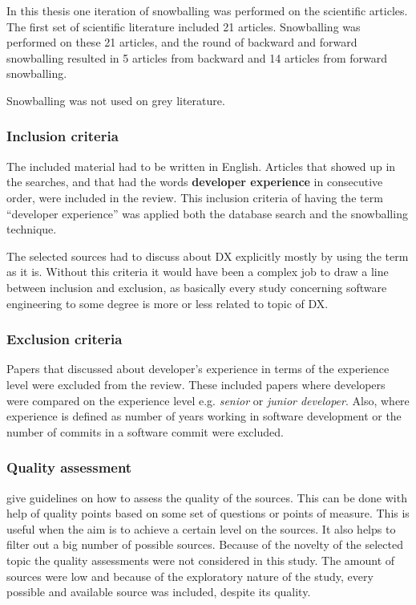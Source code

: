\documentclass[english, 12pt, a4paper, sci, utf8, a-1b, online]{aaltothesis}
\begin{document}
In this thesis one iteration of snowballing was performed on the scientific articles. The first set of scientific literature included 21 articles. Snowballing was performed on these 21 articles, and the round of backward and forward snowballing resulted in 5 articles from backward and 14 articles from forward snowballing.

Snowballing was not used on grey literature.

\subsubsection{Inclusion criteria}

The included material had to be written in English. Articles that showed up in the searches, and that had the words \textbf{developer experience} in consecutive order, were included in the review. This inclusion criteria of having the term ``developer experience'' was applied both the database search and the snowballing technique.

The selected sources had to discuss about DX explicitly mostly by using the term as it is. Without this criteria it would have been a complex job to draw a line between inclusion and exclusion, as basically every study concerning software engineering to some degree is more or less related to topic of DX.

\subsubsection{Exclusion criteria}

Papers that discussed about developer's experience in terms of the experience level were excluded from the review. These included papers where developers were compared on the experience level e.g. \textit{senior} or \textit{junior developer}. Also, where experience is defined as number of years working in software development or the number of commits in a software commit were excluded.

\subsubsection{Quality assessment}

\textcite{guidelines-for-MLR} give guidelines on how to assess the quality of the sources. This can be done with help of quality points based on some set of questions or points of measure. This is useful when the aim is to achieve a certain level on the sources. It also helps to filter out a big number of possible sources. Because of the novelty of the selected topic the quality assessments were not considered in this study. The amount of sources were low and because of the exploratory nature of the study, every possible and available source was included, despite its quality.
\end{document}
